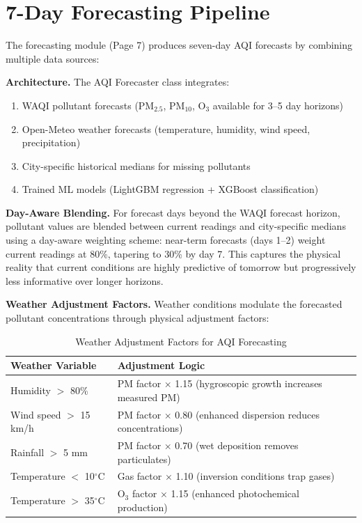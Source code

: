 \documentclass[12pt,a4paper]{report}
\begin{document}
\section{7-Day Forecasting Pipeline}

The forecasting module (Page 7) produces seven-day AQI forecasts by combining multiple data sources:

\textbf{Architecture.} The AQI Forecaster class integrates:
\begin{enumerate}
    \item WAQI pollutant forecasts (PM$_{2.5}$, PM$_{10}$, O$_3$ available for 3--5 day horizons)
    \item Open-Meteo weather forecasts (temperature, humidity, wind speed, precipitation)
    \item City-specific historical medians for missing pollutants
    \item Trained ML models (LightGBM regression + XGBoost classification)
\end{enumerate}

\textbf{Day-Aware Blending.} For forecast days beyond the WAQI forecast horizon, pollutant values are blended between current readings and city-specific medians using a day-aware weighting scheme: near-term forecasts (days 1--2) weight current readings at 80\%, tapering to 30\% by day 7. This captures the physical reality that current conditions are highly predictive of tomorrow but progressively less informative over longer horizons.

\textbf{Weather Adjustment Factors.} Weather conditions modulate the forecasted pollutant concentrations through physical adjustment factors:

\begin{table}[H]
\centering
\caption{Weather Adjustment Factors for AQI Forecasting}
\label{tab:weather_factors}
\begin{tabular}{|l|p{8cm}|}
\hline
\textbf{Weather Variable} & \textbf{Adjustment Logic} \\
\hline
Humidity $>$ 80\% & PM factor $\times$ 1.15 (hygroscopic growth increases measured PM) \\
\hline
Wind speed $>$ 15 km/h & PM factor $\times$ 0.80 (enhanced dispersion reduces concentrations) \\
\hline
Rainfall $>$ 5 mm & PM factor $\times$ 0.70 (wet deposition removes particulates) \\
\hline
Temperature $<$ 10$^\circ$C & Gas factor $\times$ 1.10 (inversion conditions trap gases) \\
\hline
Temperature $>$ 35$^\circ$C & O$_3$ factor $\times$ 1.15 (enhanced photochemical production) \\
\hline
\end{tabular}
\end{table}
\end{document}
